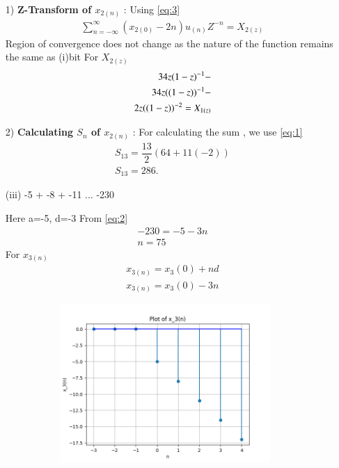 \documentclass[journal,12pt,twocolumn]{IEEEtran}
\theoremstyle{remark}
\begin{document}
\begin{enumerate}
\vspace{0.05cm}
\item[1)] 
\textbf{Z-Transform of $x_{2(n)}$} :
Using \eqref{eq:3}\vspace{0.05cm}
\begin{align}
\sum_{n=-\infty}^{\infty}(x_{2(0)} -2n)u_{(n)}Z^{-n} =X_{2(z)}
\end{align}
Region of convergence does not change as the nature of the function remains the same as (i)bit\vspace{0.05cm}
For $X_{2(z)}$ 
\begin{align}
  \notag 34z(1-z)^{-1}-\\
\notag 34z((1-z))^{-1}-\\
       2z((1-z))^{-2}=X_{1(z)}
\end{align}

\item[2)] 
\textbf{Calculating $S_n$ of $x_{2(n)}$} :
For calculating the sum , we use \eqref{eq:1}
\begin{align}
 S_{13} = \dfrac{13}{2}(64+11(-2))\\
 S_{13}= 286.
 \end{align}
 
\vspace{0.5cm}
\item[(iii)]
-5 + -8 + -11 ... -230\vspace{0.05cm}
\vspace{0.2cm}

Here a=-5, d=-3\vspace{0.05cm}
From \eqref{eq:2}
\begin{align}
-230= -5 -3n \\
n=75
\end{align}
For $x_{3(n)}$
\begin{align}
x_{3(n)} = x_3{(0)} + nd\\
x_{3(n)}=x_3{(0)} - 3n
\end{align}

\begin{figure}[!ht]   
\centering
\graphicspath{ {figs/} }
\includegraphics[width=10cm, height=6cm]{graph_3}
\label{graph:4}
\end{figure}


\end{enumerate}
\end{document}
